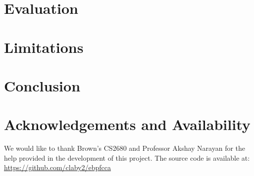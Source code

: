 \section{Evaluation}


\section{Limitations}


\section{Conclusion}


\section{Acknowledgements and Availability}

We would like to thank Brown's CS2680 and Professor Akshay Narayan for the help provided in the development of this project. The source code is available at: \\
\url{https://github.com/claby2/ebpfcca}






